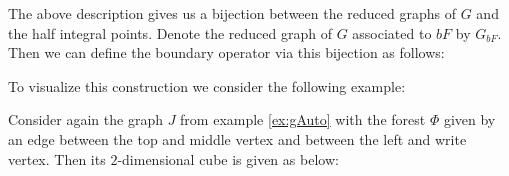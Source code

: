 The above description gives us a bijection between the reduced graphs of $G$ and the half integral points.
Denote the reduced graph of $G$ associated to $bF$ by $G_{bF}$. Then we can define the boundary operator via this bijection as follows:


To visualize this construction we consider the following example:
\begin{eg}
	Consider again the graph $J$ from example \ref{ex:gAuto} with the forest $\Phi$ given by an edge between the top and middle vertex and
	between the left and write vertex.
	Then its $2$-dimensional cube is given as below:
\end{eg}

\newpage
\printbibliography




